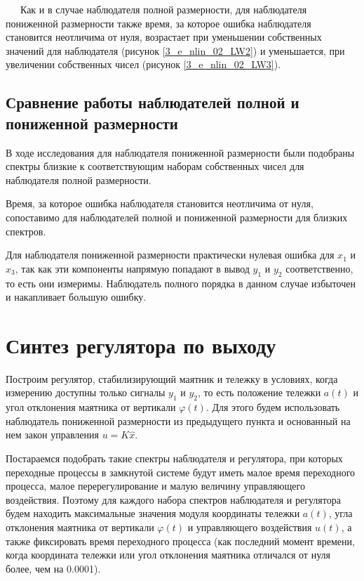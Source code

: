 \newpage
\,
\newpage
\,
\newpage
\,
\newpage
Как и в случае наблюдателя полной размерности, для наблюдателя пониженной размерности также время, за которое ошибка наблюдателя становится неотличима от нуля, возрастает при уменьшении собственных значений для наблюдателя (рисунок \ref{3_e_nlin_02_LW2}) и уменьшается, при увеличении собственных чисел (рисунок \ref{3_e_nlin_02_LW3}).

\subsection{Сравнение работы наблюдателей полной и пониженной размерности}

В ходе исследования для наблюдателя пониженной размерности были подобраны спектры близкие к соответствующим наборам собственных чисел для наблюдателя полной размерности. 

Время, за которое ошибка наблюдателя становится неотличима от нуля, сопоставимо для наблюдателей полной и пониженной размерности для близких спектров. 

Для наблюдателя пониженной размерности практически нулевая ошибка для $x_1$ и $x_3$, так как эти компоненты напрямую попадают в вывод $y_1$ и $y_2$ соответственно, то есть они измеримы. Наблюдатель полного порядка в данном случае избыточен и накапливает большую ошибку. 


\section{Синтез регулятора по выходу}
Построим регулятор, стабилизирующий маятник и тележку в условиях, когда измерению доступны только сигналы $y_1$ и $y_2$, то есть положение тележки $a(t)$ и угол отклонения маятника от вертикали $\varphi(t)$. Для этого будем использовать наблюдатель пониженной размерности из предыдущего пункта и основанный на нем закон управления $u = K \hat{x}$.


Постараемся подобрать такие спектры наблюдателя и регулятора, при которых переходные процессы в замкнутой системе будут иметь малое время переходного процесса, малое перерегулирование и малую величину управляющего воздействия. Поэтому для каждого набора спектров наблюдателя и регулятора будем находить  максимальные значения модуля координаты тележки $a(t)$, угла отклонения маятника от вертикали $\varphi(t)$ и управляющего воздействия $u(t)$, а также фиксировать время переходного процесса (как последний момент времени, когда координата тележки или угол отклонения маятника отличался от нуля более, чем на 0.0001).


